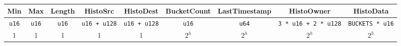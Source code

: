 \begin{tabular}{@{}ccccccccc@{}}\toprule
        Min & Max & Length & HistoSrc & HistoDest & BucketCount & LastTimestamp & HistoOwner & HistoData \\ \midrule
        \texttt{u16} & \texttt{u16} & \texttt{u16} & \texttt{u16 + u128} & \texttt{u16 + u128} & \texttt{u16} & \texttt{u64} & \texttt{3 * u16 + 2 * u128} & \texttt{BUCKETS * u16} \\
        1 & 1 & 1 & 1 & 1 & $2^h$ & $2^h$ & $2^h$ & $2^h$ \\ \bottomrule
\end{tabular}